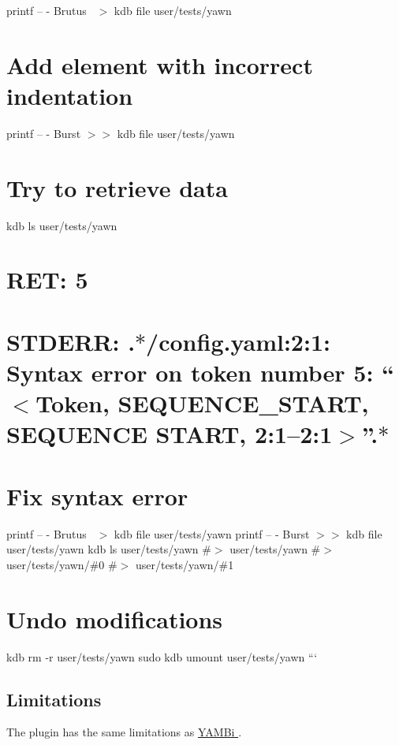 printf -- \textquotesingle{} -\/ Brutus~\newline
\textquotesingle{} $>$ {\ttfamily kdb file user/tests/yawn} \section*{Add element with incorrect indentation}

printf -- \textquotesingle{}-\/ Burst\textquotesingle{} $>$$>$ {\ttfamily kdb file user/tests/yawn}

\section*{Try to retrieve data}

kdb ls user/tests/yawn \section*{R\+ET\+: 5}

\section*{S\+T\+D\+E\+RR\+: .$\ast$/config.yaml\+:2\+:1\+: Syntax error on token number 5\+: “$<$Token, S\+E\+Q\+U\+E\+N\+C\+E\+\_\+\+S\+T\+A\+RT, S\+E\+Q\+U\+E\+N\+CE S\+T\+A\+RT, 2\+:1–2\+:1$>$”.$\ast$}

\section*{Fix syntax error}

printf -- \textquotesingle{} -\/ Brutus~\newline
\textquotesingle{} $>$ {\ttfamily kdb file user/tests/yawn} printf -- \textquotesingle{} -\/ Burst\textquotesingle{} $>$$>$ {\ttfamily kdb file user/tests/yawn} kdb ls user/tests/yawn \#$>$ user/tests/yawn \#$>$ user/tests/yawn/\#0 \#$>$ user/tests/yawn/\#1

\section*{Undo modifications}

kdb rm -\/r user/tests/yawn sudo kdb umount user/tests/yawn ```

\subsection*{Limitations}

The plugin has the same limitations as \hyperlink{md_src_plugins_yambi_README_src_plugins_yambi_README_md}{Y\+A\+M\+Bi }. 